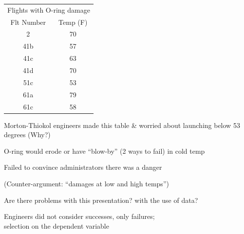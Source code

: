 \documentclass[pdflatex,landscape,titlepage]{foils}
\begin{document}
\begin{center}
\begin{tabular}{cc}
\toprule
\multicolumn{2}{c}{Flights with O-ring damage}\\
Flt Number      &       Temp (F)        \\
\midrule
2       &       70      \\
41b     &       57      \\
41c     &       63      \\
41d     &       70      \\
51c     &       53      \\
61a     &       79      \\
61c     &       58      \\
\bottomrule
\end{tabular}
\end{center}

Morton-Thiokol engineers made this table \& worried about launching below 53 degrees (Why?)

O-ring would erode or have ``blow-by'' (2 ways to fail) in cold temp

Failed to convince administrators there was a danger

(Counter-argument:  ``damages at low and high temps'')

Are there problems with this presentation?  with the use of data?


Engineers did not consider successes, only failures; \\
selection on the dependent variable
\end{document}
